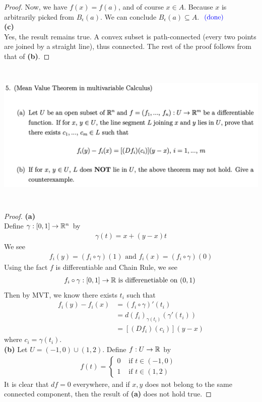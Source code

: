\documentclass{report}
\begin{document}
\begin{proof}
Now, we have $f(x)=f(a)$, and of course $x \in A$. Because $x$ is arbitrarily picked from  $B_\epsilon (a)$. We can conclude $B_\epsilon (a)\subseteq A$. $\textcolor{blue}{\text{ (done) }}$\\

\textbf{(c)} \\

Yes, the result remains true. A convex subset is path-connected (every two points are joined by a straight line), thus connected. The rest of the proof follows from that of \textbf{(b)}. 




\end{proof}
\begin{question}{}{}
\includegraphics[height=7cm,width=18cm]{ahw5q5}
\end{question}
\begin{proof}
\textbf{(a)}\\

Define $\gamma :[0,1]\rightarrow \mathbb{R}^n$ by 
\begin{align*}
\gamma (t)=x+(y-x)t
\end{align*}
We see 
\begin{align*}
f_i(y)=(f_i\circ \gamma )(1)\text{ and }f_i(x)=(f_i\circ \gamma )(0)
\end{align*}
Using the fact $f$ is differentiable and Chain Rule, we see 
\begin{align*}
f_i\circ \gamma:[0,1]\rightarrow \mathbb{R} \text{ is differenetiable on $(0,1)$ }
\end{align*}
Then by MVT, we know there exists $t_i$ such that 
 \begin{align*}
f_i(y)-f_i(x)&= (f_i\circ \gamma )'(t_i)\\
&=d(f_i)_{\gamma (t_i)}(\gamma '(t_i))\\
&=[(Df_i)(c_i)](y-x)
\end{align*}
where $c_i=\gamma (t_i)$.\\

\textbf{(b)}
Let $U=(-1,0)\cup  (1,2)$. Define $f:U\rightarrow \mathbb{R}$ by 
\begin{align*}
f(t)=\begin{cases}
  0 & \text{ if $t \in (-1,0)$ }\\
  1& \text{ if $t\in (1,2)$ }
\end{cases}
\end{align*}
It is clear that $df=0$ everywhere,  and if $x,y$ does not belong to the same connected component, then the result of \textbf{(a)} does not  hold true. 
\end{proof}
\end{document}
